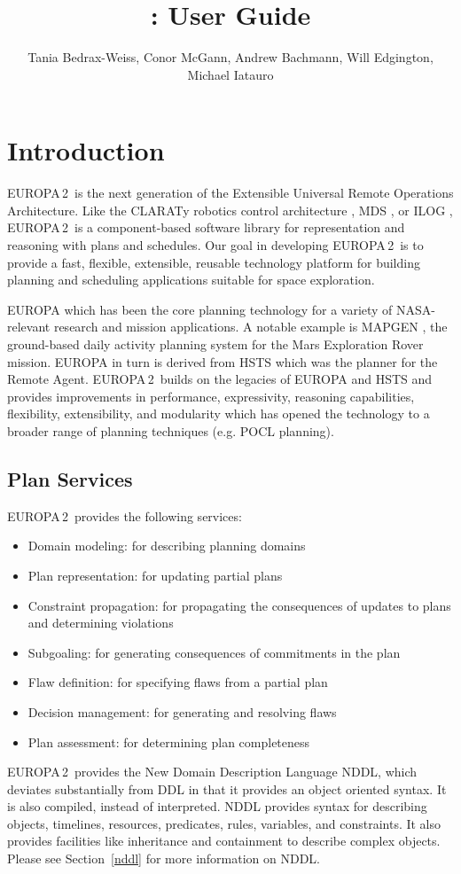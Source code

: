 \documentclass[10pt, letterpaper, twoside]{article}
\author{Tania Bedrax-Weiss, Conor McGann, Andrew Bachmann, Will Edgington,
Michael Iatauro}
\title{\ET: User Guide}
\begin{document}
\newcommand{\ET}{EUROPA\,2}

\maketitle

\tableofcontents

\section{Introduction}
\ET\, is the next generation of the Extensible Universal Remote
Operations Architecture.  Like the CLARATy robotics control architecture
\cite{kn:Ne}, MDS \cite{MDS}, or ILOG \cite{ILOG}, \ET\, is a
component-based software library for representation and reasoning with
plans and schedules. Our goal in developing \ET\, is to provide a fast,
flexible, extensible, reusable technology platform for building planning
and scheduling applications suitable for space exploration.

EUROPA \cite{caip,plan} which has been the core planning technology for a
variety of NASA-relevant research and mission applications. A notable
example is MAPGEN \cite{mapgen}, the ground-based daily activity planning
system for the Mars Exploration Rover mission. EUROPA in turn is derived
from HSTS which was the planner for the Remote Agent\cite{ra}. \ET\,
builds on the legacies of EUROPA and HSTS and provides improvements in
performance, expressivity, reasoning capabilities, flexibility,
extensibility, and modularity which has opened the technology to a broader
range of planning techniques (e.g. POCL planning).

\subsection{Plan Services}
\ET\, provides the following services:
\begin{itemize}
\item Domain modeling: for describing planning domains
\item Plan representation: for updating partial plans 
\item Constraint propagation: for propagating the consequences of updates
to plans and determining violations
\item Subgoaling: for generating consequences of commitments in the plan
\item Flaw definition: for specifying flaws from a partial plan
\item Decision management: for generating and resolving flaws
\item Plan assessment: for determining plan completeness
\end{itemize}
\ET\, provides the New Domain Description Language NDDL, which deviates
substantially from DDL in that it provides an object oriented syntax.  It
is also compiled, instead of interpreted.  NDDL provides syntax for
describing objects, timelines, resources, predicates, rules, variables, and
constraints. It also provides facilities like inheritance and containment
to describe complex objects.  Please see Section~\ref{nddl} for more
information on NDDL. 
\end{document}
